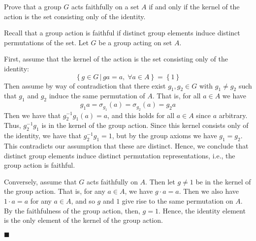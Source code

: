 \documentclass[12pt]{article}
\renewcommand{\qed}{\hfill$\blacksquare$}
\renewenvironment{proof}{\begin{addmargin}[1em]{0em}\begin{newproof}}{\end{newproof}\end{addmargin}\qed}
\newenvironment{problem}[2][Exercise]{\begin{trivlist}
\item[\hskip \labelsep {\bfseries #1}\hskip \labelsep {\bfseries #2.}]}{\end{trivlist}}
\begin{document}
\begin{problem}{1.7.6}
Prove that a group $G$ acts faithfully on a set $A$ if and only if the kernel of the action is the set consisting only of the identity.
\end{problem}
\begin{proof}
Recall that a group action is faithful if distinct group elements induce distinct permutations of the set. Let $G$ be a group acting on set $A$.

First, assume that the kernel of the action is the set consisting only of the identity:
$$ \left\{ g\in G \, | \, ga=a, \; \forall a\in A \right\} = \left\{1\right\} $$ Then assume by way of contradiction that there exist $g_1,g_2\in G$ with $g_1\neq g_2$ such that $g_1$ and $g_2$ induce the same permutation of $A$. That is, for all $a\in A$ we have $$ g_1 a = \sigma_{g_1}\left(a\right) = \sigma_{g_2}\left(a\right) = g_2 a $$ Then we have that $g_2^{-1}g_1 \left(a\right)= a$, and this holds for all $a\in A$ since $a$ arbitrary. Thus, $g_2^{-1}g_1$ is in the kernel of the group action. Since this kernel consists only of the identity, we have that $g_2^{-1}g_1=1$, but by the group axioms we have $g_1=g_2$. This contradicts our assumption that these are distinct. Hence, we conclude that distinct group elements induce distinct permutation representations, i.e., the group action is faithful.

Conversely, assume that $G$ acts faithfully on $A$. Then let $g\neq 1$ be in the kernel of the group action. That is, for any $a\in A$, we have $g\cdot a = a$. Then we also have $1\cdot a = a$ for any $a\in A$, and so $g$ and $1$ give rise to the same permutation on $A$. By the faithfulness of the group action, then, $g=1$. Hence, the identity element is the only element of the kernel of the group action.
\end{proof}
\end{document}
